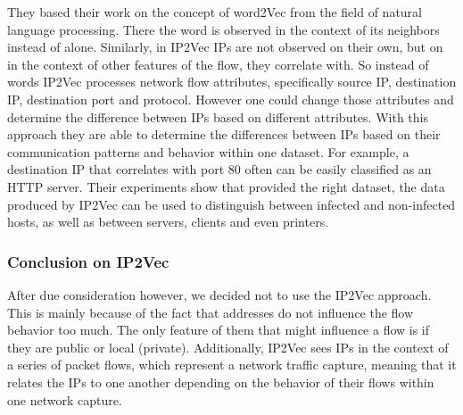 \documentclass[
	ngerman,
	ruledheaders=section,%
	class=report,%
	thesis={type=bachelor},%
	accentcolor=9c,%
	custommargins=true,%
	marginpar=false,%
	parskip=half-,%
	fontsize=11pt,%
	twoside
]{tudapub}
\begin{document}
They based their work on the concept of word2Vec from the field of natural language processing.
There the word is observed in the context of its neighbors instead of alone.
Similarly, in IP2Vec IPs are not observed on their own, but on in the context of other features of the flow, they correlate with.
So instead of words IP2Vec processes network flow attributes,
specifically source IP, destination IP, destination port and protocol.
However one could change those attributes and determine the difference between IPs based on different attributes.
With this approach they are able to determine the differences between IPs based on their communication patterns and behavior within one dataset.
For example, a destination IP that correlates with port 80 often can be easily classified as an HTTP server.
Their experiments show that provided the right dataset, the data produced by IP2Vec can be used to distinguish between infected and non-infected hosts, as well as between servers, clients and even printers.

\subsubsection{Conclusion on IP2Vec}
\label{sec:conclusionIP2Vec}




After due consideration however, we decided not to use the IP2Vec approach.
This is mainly because of the fact that addresses do not influence the flow behavior too much.
The only feature of them that might influence a flow is if they are public or local (private).
Additionally, IP2Vec sees IPs in the context of a series of packet flows, which represent a network traffic capture,
meaning that it relates the IPs to one another depending on the behavior of their flows within one network capture.
\end{document}
